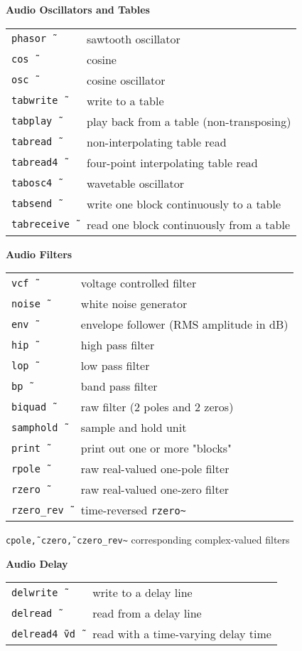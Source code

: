 \documentclass[a4paper, landscape, 9pt]{extarticle}
\newcommand{\refcardtitle}[1]{
  \begin{center}
    \textbf{\small{#1}}
  \end{center}
}
\begin{document}
\begin{multicols}{3}
  \refcardtitle{Audio Oscillators and Tables}
  \begin{tabularx}{9cm}{>{\tt}l X}
    phasor\~\ & sawtooth oscillator \\
    cos\~\ & cosine \\
    osc\~\ & cosine oscillator \\
    tabwrite\~\ & write to a table \\
    tabplay\~\ & play back from a table (non-transposing) \\
    tabread\~\ & non-interpolating table read \\
    tabread4\~\ & four-point interpolating table read \\
    tabosc4\~\ & wavetable oscillator \\ 
    tabsend\~\ & write one block continuously to a table \\
    tabreceive\~\ & read one block continuously from a table \\
  \end{tabularx}
  
  \refcardtitle{Audio Filters}
  \begin{tabularx}{9cm}{>{\tt}l X}
    vcf\~\ & voltage controlled filter \\
    noise\~\ &  white noise generator \\
    env\~\ & envelope follower (RMS amplitude in dB) \\
    hip\~\ &  high pass filter \\
    lop\~\ &  low pass filter \\ 
    bp\~\ &  band pass filter \\
    biquad\~\ & raw filter (2 poles and 2 zeros)\\ 
    samphold\~\ & sample and hold unit \\
    print\~\ & print out one or more "blocks" \\
    rpole\~\ & raw real-valued one-pole filter \\
    rzero\~\ & raw real-valued one-zero filter \\
    rzero\_rev\~\ & time-reversed \texttt{rzero\~} \\
  \end{tabularx}
  \texttt{cpole\~, czero\~, czero\_rev\~} corresponding complex-valued filters

  \refcardtitle{Audio Delay}
  \begin{tabularx}{9cm}{>{\tt}l X}
    delwrite\~\ & write to a delay line \\
    delread\~\ & read from a delay line \\
    delread4\~\ vd\~\ & read with a time-varying delay time \\
  \end{tabularx}
  

\end{multicols}
\end{document}
